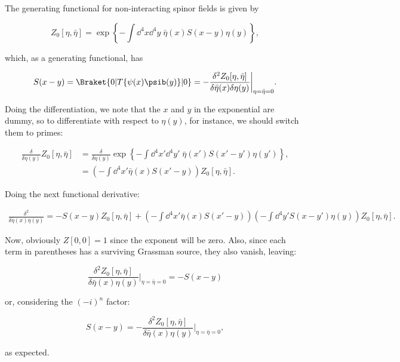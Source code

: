 \section{}

The generating functional for non-interacting spinor fields is given by

\begin{equation}
  Z_0[\eta,\bar{\eta}] = \exp\left\{- \int \dd^4x\dd^4y \; \bar{\eta}(x) S(x-y) \eta(y)\right\},
\end{equation}

which, as a generating functional, has

\begin{equation}
  S(x-y) = \Braket{0 | T\{\psi(x)\psib(y)\} | 0} = - \frac{\delta^2Z_0[\eta,\bar{\eta}]}{\delta\bar{\eta}(x)\delta\eta(y)}\bigg|_{\eta = \bar{\eta}=0}.
\end{equation}

Doing the differentiation, we note that the $x$ and $y$ in the exponential are dummy, so to differentiate with respect to $\eta(y)$, for instance, we should switch them to primes:

\begin{align}
  \frac{\delta}{\delta\eta(y)}Z_0[\eta,\bar{\eta}] &= \frac{\delta}{\delta\eta(y)} \exp\left\{- \int \dd^4x'\dd^4y' \; \bar{\eta}(x') S(x'-y') \eta(y')\right\}, \\
                                                         &= \left(-\int \dd^4x' \bar{\eta}(x) S(x'-y) \right)Z_0[\eta,\bar{\eta}].
\end{align}

Doing the next functional derivative:

\begin{align}
  \frac{\delta^2}{\delta\bar{\eta}(x)\eta(y)} = -S(x-y)Z_0[\eta,\bar{\eta}] + \left(-\int \dd^4x' \bar{\eta}(x) S(x'-y) \right)\left(-\int \dd^4y' S(x-y') \eta(y) \right)Z_0[\eta,\bar{\eta}].
\end{align}

Now, obviously $Z[0,0] = 1$ since the exponent will be zero. Also, since each term in parentheses has a surviving Grassman source, they also vanish, leaving:

\begin{equation}
  \frac{\delta^2 Z_0[\eta,\bar{\eta}]}{\delta\bar{\eta}(x)\eta(y)}\bigg|_{\eta = \bar{\eta} = 0} = -S(x-y)
\end{equation}

or, considering the $(-i)^n$ factor:

\begin{equation}
  \boxed{S(x-y) = -\frac{\delta^2 Z_0[\eta,\bar{\eta}]}{\delta\bar{\eta}(x)\eta(y)}\bigg|_{\eta = \bar{\eta} = 0},}
\end{equation}

as expected.
  




